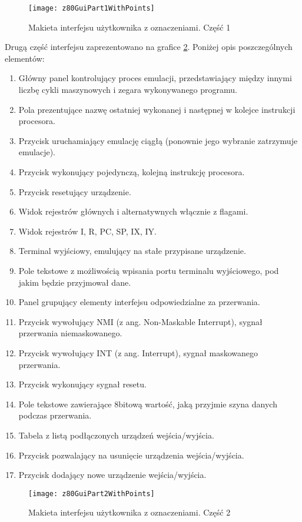 	\begin{figure}[h]
		\centering
		\texttt{[image: z80GuiPart1WithPoints]}
		\caption{Makieta interfejsu użytkownika z oznaczeniami. Część 1}
		\label{img:z80GuiPart1WithPoints}
	\end{figure}
	
	Drugą część interfejsu zaprezentowano na grafice \ref{img:z80GuiPart2WithPoints}. Poniżej opis poszczególnych elementów:
	\begin{enumerate}
		\item Główny panel kontrolujący proces emulacji, przedstawiający między innymi liczbę cykli maszynowych i zegara wykonywanego programu.
		\item Pola prezentujące nazwę ostatniej wykonanej i następnej w kolejce instrukcji procesora.
		\item Przycisk uruchamiający emulację ciągłą (ponownie jego wybranie zatrzymuje emulacje).
		\item Przycisk wykonujący pojedynczą, kolejną instrukcję procesora.
		\item Przycisk resetujący urządzenie.
		\item Widok rejestrów głównych i alternatywnych włącznie z flagami.
		\item Widok rejestrów I, R, PC, SP, IX, IY.
		\item Terminal wyjściowy, emulujący na stałe przypisane urządzenie. 
		\item Pole tekstowe z możliwością wpisania portu terminalu wyjściowego, pod jakim będzie przyjmował dane.
		\item Panel grupujący elementy interfejsu odpowiedzialne za przerwania.
		\item Przycisk wywołujący NMI (z ang. Non-Maskable Interrupt), sygnał przerwania niemaskowanego.
		\item Przycisk wywołujący INT (z ang. Interrupt), sygnał maskowanego przerwania.
		\item Przycisk wykonujący sygnał resetu.
		\item Pole tekstowe zawierające 8bitową wartość, jaką przyjmie szyna danych podczas przerwania.
		\item Tabela z listą podłączonych urządzeń wejścia/wyjścia.
		\item Przycisk pozwalający na usunięcie urządzenia wejścia/wyjścia.
		\item Przycisk dodający nowe urządzenie wejścia/wyjścia.
	\end{enumerate}
	
	\begin{figure}[h]
		\centering
		\texttt{[image: z80GuiPart2WithPoints]}
		\caption{Makieta interfejsu użytkownika z oznaczeniami. Część 2}
		\label{img:z80GuiPart2WithPoints}
	\end{figure}

	
	